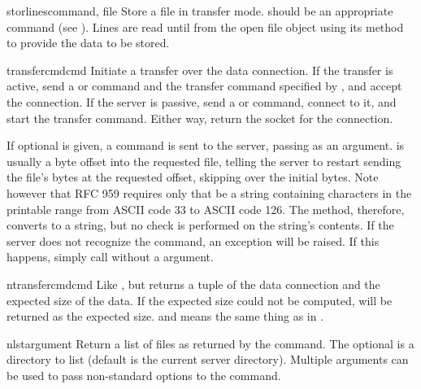 \begin{methoddesc}[FTP]{storlines}{command, file}
Store a file in \ASCII{} transfer mode.   should be an
appropriate  command (see ).  Lines are
read until \EOF{} from the open file object  using its
 method to provide the data to be stored.
\end{methoddesc}

\begin{methoddesc}[FTP]{transfercmd}{cmd}
Initiate a transfer over the data connection.  If the transfer is
active, send a  or   command and the transfer command specified
by , and accept the connection.  If the server is passive,
send a  or  command, connect to it, and start the transfer
command.  Either way, return the socket for the connection.

If optional  is given, a  command is
sent to the server, passing  as an argument.   is
usually a byte offset into the requested file, telling the server to
restart sending the file's bytes at the requested offset, skipping
over the initial bytes.  Note however that RFC
959 requires only that  be a string containing characters
in the printable range from ASCII code 33 to ASCII code 126.  The
 method, therefore, converts
 to a string, but no check is
performed on the string's contents.  If the server does
not recognize the  command, an
 exception will be raised.  If this happens,
simply call  without a  argument.
\end{methoddesc}

\begin{methoddesc}[FTP]{ntransfercmd}{cmd}
Like , but returns a tuple of the data
connection and the expected size of the data.  If the expected size
could not be computed,  will be returned as the expected
size.   and  means the same thing as in
.
\end{methoddesc}

\begin{methoddesc}[FTP]{nlst}{argument\optional{, \ldots}}
Return a list of files as returned by the  command.  The
optional  is a directory to list (default is the current
server directory).  Multiple arguments can be used to pass
non-standard options to the  command.
\end{methoddesc}

